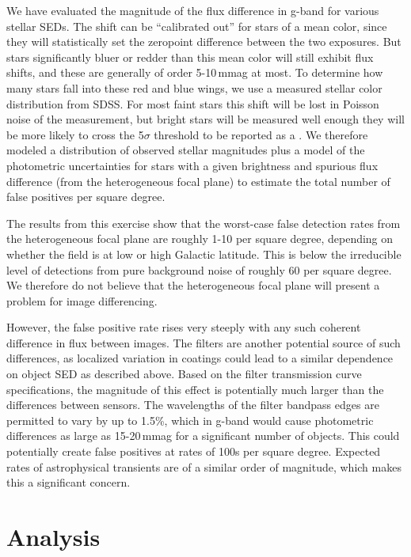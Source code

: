 \documentclass[DM,toc]{lsstdoc}
\begin{document}
We have evaluated the magnitude of the flux difference in g-band for various
stellar SEDs. The shift can be ``calibrated out'' for stars of a mean color,
since they will statistically set the zeropoint difference between the two
exposures. But stars significantly bluer or redder than this mean color will
still exhibit flux shifts, and these are generally of order 5-10\,mmag at most.
To determine how many stars fall into these red and blue wings, we use a
measured stellar color distribution from SDSS. For most faint stars
this shift will be lost in Poisson noise of the measurement, but bright stars
will be measured well enough they will be more likely to cross the 5$\sigma$
threshold to be reported as a \DIASources. We therefore modeled a distribution
of observed stellar magnitudes plus a model of the photometric uncertainties for
stars with a given brightness and spurious flux difference (from the heterogeneous focal
plane) to estimate the total number of false positives per square degree.

The results from this exercise show that the worst-case false detection rates
from the heterogeneous focal plane are roughly 1-10 per square degree, depending on
whether the field is at low or high Galactic latitude. This is below the
irreducible level of detections from pure background noise of roughly 60 per square degree.
We therefore do not believe that the heterogeneous focal plane will present a problem
for image differencing.

However, the false positive rate rises very steeply with any such coherent
difference in flux between images. The filters are another potential source of
such differences, as localized variation in coatings could lead to a similar
dependence on object SED as described above. Based on the filter transmission
curve specifications, the magnitude of this effect is potentially much larger
than the differences between sensors. The wavelengths of the filter bandpass
edges are permitted to vary by up to 1.5\%, which in g-band would cause
photometric differences as large as 15-20\,mmag for a significant number of
objects. This could potentially create false positives at rates of 100s per
square degree. Expected rates of astrophysical transients are of a similar order
of magnitude, which makes this a significant concern.

\section{Analysis}
\end{document}

